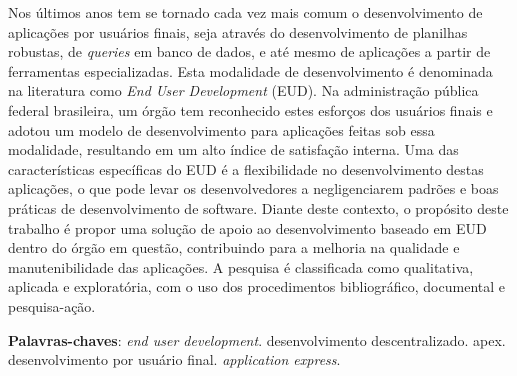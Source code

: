 \begin{resumo}

Nos últimos anos tem se tornado cada vez mais comum o desenvolvimento de aplicações por usuários finais, seja através do desenvolvimento de planilhas robustas, de \textit{queries} em banco de dados, e até mesmo de aplicações a partir de ferramentas especializadas. Esta modalidade de desenvolvimento é denominada na literatura como \textit{End User Development} (EUD). Na administração pública federal brasileira, um órgão tem reconhecido estes esforços dos usuários finais e adotou um modelo de desenvolvimento para aplicações feitas sob essa modalidade, resultando em um alto índice de satisfação interna. Uma das características específicas do EUD é a flexibilidade no desenvolvimento destas aplicações, o que pode levar os desenvolvedores a negligenciarem padrões e boas práticas de desenvolvimento de software. Diante deste contexto, o propósito deste trabalho é propor uma solução de apoio ao desenvolvimento baseado em EUD dentro do órgão em questão, contribuindo para a melhoria na qualidade e manutenibilidade das aplicações. A pesquisa é classificada como qualitativa, aplicada e exploratória, com o uso dos procedimentos bibliográfico, documental e pesquisa-ação.



 \vspace{\onelineskip}
    
 \noindent
 \textbf{Palavras-chaves}: \textit{end user development}. desenvolvimento descentralizado. apex. desenvolvimento por usuário final. \textit{application express}.
\end{resumo}
